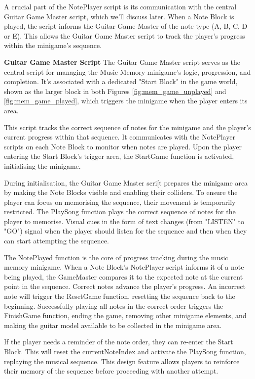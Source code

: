\documentclass{l4proj}
\begin{document}
A crucial part of the NotePlayer script is its communication with the central Guitar Game Master script, which we'll discuss later. When a Note Block is played, the script informs the Guitar Game Master of the note type (A, B, C, D or E). This allows the Guitar Game Master script to track the player's progress within the minigame's sequence.

\textbf{Guitar Game Master Script} \newline
The Guitar Game Master script serves as the central script for managing the Music Memory minigame's logic, progression, and completion. It's associated with a dedicated "Start Block" in the game world, shown as the larger block in both Figures \ref{fig:mem_game_unplayed} and  \ref{fig:mem_game_played}, which triggers the minigame when the player enters its area.

This script tracks the correct sequence of notes for the minigame and the player's current progress within that sequence. It communicates with the NotePlayer scripts on each Note Block to monitor when notes are played. Upon the player entering the Start Block's trigger area, the StartGame function is activated, initialising the minigame.

During initialisation, the Guitar Game Master scri[t prepares the minigame area by making the Note Blocks visible and enabling their colliders. To ensure the player can focus on memorising the sequence, their movement is temporarily restricted. The PlaySong function plays the correct sequence of notes for the player to memorise. Visual cues in the form of text changes (from "LISTEN" to "GO") signal when the player should listen for the sequence and then when they can start attempting the sequence.

The NotePlayed function is the core of progress tracking during the music memory minigame. When a Note Block's NotePlayer script informs it of a note being played, the GameMaster compares it to the expected note at the current point in the sequence. Correct notes advance the player's progress. An incorrect note will trigger the ResetGame function, resetting the sequence back to the beginning. Successfully playing all notes in the correct order triggers the FinishGame function, ending the game, removing other minigame elements, and making the guitar model available to be collected in the minigame area.

If the player needs a reminder of the note order, they can re-enter the Start Block. This will reset the currentNoteIndex and activate the PlaySong function, replaying the musical sequence. This design feature allows players to reinforce their memory of the sequence before proceeding with another attempt.
\end{document}
